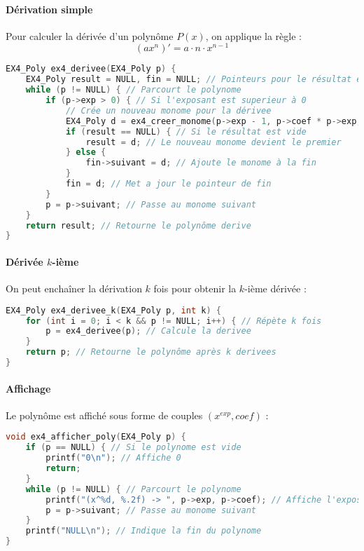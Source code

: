 \documentclass[a4paper,12pt]{article}
\begin{document}
\paragraph{Dérivation simple}

Pour calculer la dérivée d’un polynôme $P(x)$, on applique la règle :  
\[
(ax^n)' = a \cdot n \cdot x^{n-1}
\]

\begin{lstlisting}[language=C, caption={Dérivée d’un polynôme}]
EX4_Poly ex4_derivee(EX4_Poly p) {
    EX4_Poly result = NULL, fin = NULL; // Pointeurs pour le résultat et la fin de la liste
    while (p != NULL) { // Parcourt le polynome
        if (p->exp > 0) { // Si l'exposant est superieur à 0
            // Crée un nouveau monome pour la dérivee
            EX4_Poly d = ex4_creer_monome(p->exp - 1, p->coef * p->exp, NULL);
            if (result == NULL) { // Si le résultat est vide
                result = d; // Le nouveau monome devient le premier
            } else {
                fin->suivant = d; // Ajoute le monome à la fin
            }
            fin = d; // Met a jour le pointeur de fin
        }
        p = p->suivant; // Passe au monome suivant
    }
    return result; // Retourne le polynôme derive
}

\end{lstlisting}

\paragraph{Dérivée $k$-ième}

On peut enchaîner la dérivation $k$ fois pour obtenir la $k$-ième dérivée :

\begin{lstlisting}[language=C, caption={Dérivée k-ième}]
EX4_Poly ex4_derivee_k(EX4_Poly p, int k) {
    for (int i = 0; i < k && p != NULL; i++) { // Répète k fois
        p = ex4_derivee(p); // Calcule la derivee
    }
    return p; // Retourne le polynôme après k derivees
}
\end{lstlisting}

\paragraph{Affichage}

Le polynôme est affiché sous forme de couples $(x^{exp}, coef)$ :

\begin{lstlisting}[language=C, caption={Affichage du polynôme}]
void ex4_afficher_poly(EX4_Poly p) {
    if (p == NULL) { // Si le polynome est vide
        printf("0\n"); // Affiche 0
        return;
    }
    while (p != NULL) { // Parcourt le polynome
        printf("(x^%d, %.2f) -> ", p->exp, p->coef); // Affiche l'exposant et le coefficient
        p = p->suivant; // Passe au monome suivant
    }
    printf("NULL\n"); // Indique la fin du polynome
}
\end{lstlisting}
\end{document}
